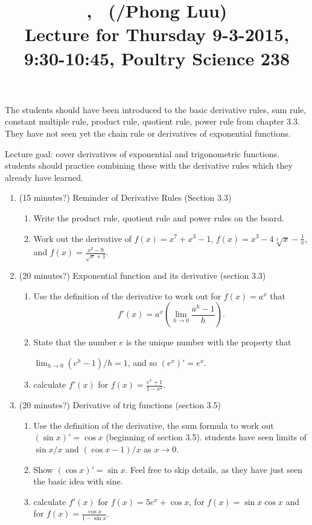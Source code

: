 \documentclass[12pt]{amsart}
\title{\course, \semester\ (\instructor/Phong Luu) \\ Lecture for Thursday 
9-3-2015, 9:30-10:45, Poultry Science 238}
\begin{document}
\maketitle
{\color{blue}The students should have been introduced to the basic
derivative rules, sum rule, constant multiple rule, product rule, quotient
rule, power rule from chapter 3.3. They have not seen yet the chain rule or
derivatives of exponential functions.}

Lecture goal: cover derivatives of exponential and trigonometric functions.
students should practice combining these with the derivative rules which
they already have learned.

\begin{enumerate}[1. ]
\setlength{\itemsep}{.3cm}
\item (15 minutes?)
Reminder of Derivative Rules (Section 3.3)
\begin{enumerate}[ i. ]
\item
Write the product rule, quotient rule and power rules on the board.
\item
Work out the derivative of $f(x) = x^7 + x^3 - 1$, $f(x) = x^3 - 4 \sqrt[3]
x - \frac 1x$, and $\displaystyle f(x) = \frac{x^2 - 9}{\sqrt x + 1}$.
\end{enumerate}

\item (20 minutes?)
Exponential function and its derivative (section 3.3)
\begin{enumerate}[ i. ]
\item
Use the definition of the derivative to work out for $f(x) = a^x$ that
$$\displaystyle f'(x) = a^x \left(\lim_{h \to 0} \frac{a^h -
1}{h}\right).$$
\item
State that the number $e$ is the unique number with the property that

$\lim_{h \to 0} (e^h - 1)/h = 1$, and so $(e^x)' = e^x$.
\item
calculate $f'(x)$ for $f(x) = \frac{e^x + 1}{1 - x^2}$.
\end{enumerate}

\item (20 minutes?)
Derivative of trig functions (section 3.5)
\begin{enumerate}[ i. ]
\item
Use the definition of the derivative, the sum formula to work out $(\sin x)'
= \cos x$ (beginning of section 3.5). students have seen limits of $\sin x
/ x$ and $(\cos x - 1)/x$ as $x \to 0$. 
\item
Show $(\cos x)' = \sin x$. Feel free to skip details, as they have just
seen the basic idea with sine.
\item
calculate $f'(x)$ for $f(x) = 5 e^x + \cos x$, for $f(x) = \sin x \cos x$
and for $\displaystyle f(x) = \frac{\cos x}{1 - \sin x}$. 
\end{enumerate}


\end{enumerate}
\end{document}
